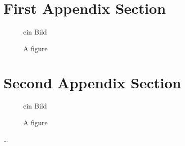 
\Appendix
\label{ch:Appendix}


\section{First Appendix Section}
\label{sec:app-first-sections}



\begin{figure} [ht]
  \centering
   ein Bild
  \caption{A figure}
  \label{fig:Beispiela}
\end{figure}


\section{Second Appendix Section}
\label{sec:app-second-sections}



\begin{figure} [ht]
  \centering
   ein Bild
  \caption{A figure}
  \label{fig:Beispielb}
\end{figure}

\dots